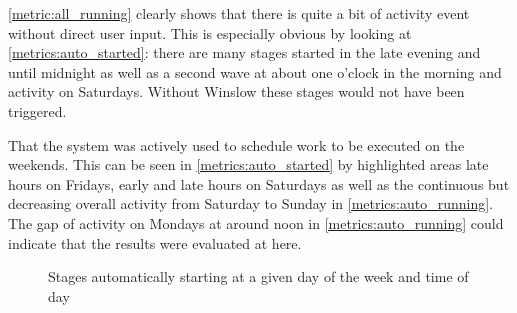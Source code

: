 \autoref{metric:all_running} clearly shows that there is quite a bit of activity event without direct user input.
This is especially obvious by looking at \autoref{metrics:auto_started}: there are many stages started in the late evening and until midnight as well as a second wave at about one o'clock in the morning and activity on Saturdays.
Without Winslow these stages would not have been triggered.

That the system was actively used to schedule work to be executed on the weekends.
This can be seen in \autoref{metrics:auto_started} by highlighted areas late hours on Fridays, early and late hours on Saturdays as well as the continuous but decreasing overall activity from Saturday to Sunday in \autoref{metrics:auto_running}.
The gap of activity on Mondays at around noon in \autoref{metrics:auto_running} could indicate that the results were evaluated at here.

\begin{figure}[H]
	\centering
	\caption{Stages automatically starting at a given day of the week and time of day}
	\label{metrics:auto_started}
\end{figure}





